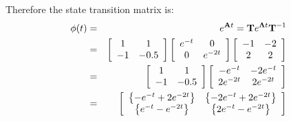 Therefore the state transition matrix is:
\begin{eqnarray*}
\mathbf{\phi}(t) & = & e^{\mathbf{A}t}=\mathbf{T}e^{\mathbf{\Lambda}t}\mathbf{T}^{-1} \\
	             & = & \left[ {\begin{array}{*{20}c}
	   1 & 1  \\
	   { - 1} & { - 0.5}  \\
	\end{array}} \right]\left[ {\begin{array}{*{20}c}
	   {e^{ - t} } & 0  \\
	   0 & {e^{ - 2t} }  \\
	\end{array}} \right]\left[ {\begin{array}{*{20}c}
	   { - 1} & { - 2}  \\
	   2 & 2  \\
	\end{array}} \right] \\
	             & = & \left[ {\begin{array}{*{20}c}
	   1 & 1  \\
	   { - 1} & { - 0.5}  \\
	\end{array}} \right]\left[ {\begin{array}{*{20}c}
	   {-e^{ - t} } & {-2e^{ - t} }  \\
	   {2e^{ - 2t} } & {2e^{ - 2t} }  \\
	\end{array}} \right] \\
	             & = & \left[ {\begin{array}{*{20}c}
	   \left\{ {-e^{ - t} + 2e^{-2t}} \right\} & \left\{ {-2e^{ - t} + 2e^{-2t}} \right\}  \\
	   \left\{ {e^{ - t} - e^{-2t}} \right\} & \left\{ {2e^{ - t} - e^{-2t}} \right\}  \\
	\end{array}} \right] \\
\end{eqnarray*}



